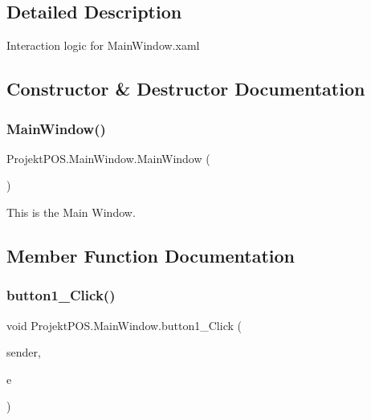 \subsection{Detailed Description}
Interaction logic for Main\+Window.\+xaml 



\subsection{Constructor \& Destructor Documentation}
\mbox{\label{class_projekt_p_o_s_1_1_main_window_accd74500e15ba53e22f8c803e78e3e65}} 
\subsubsection{\texorpdfstring{Main\+Window()}{MainWindow()}}
{\footnotesize\ttfamily Projekt\+P\+O\+S.\+Main\+Window.\+Main\+Window (\begin{DoxyParamCaption}{ }\end{DoxyParamCaption})}



This is the Main Window. 



\subsection{Member Function Documentation}
\mbox{\label{class_projekt_p_o_s_1_1_main_window_a86639632a4f0c369581fba5be73a211f}} 
\subsubsection{\texorpdfstring{button1\+\_\+\+Click()}{button1\_Click()}}
{\footnotesize\ttfamily void Projekt\+P\+O\+S.\+Main\+Window.\+button1\+\_\+\+Click (\begin{DoxyParamCaption}\item[{object}]{sender,  }\item[{Routed\+Event\+Args}]{e }\end{DoxyParamCaption})\hspace{0.3cm}{\ttfamily [private]}}



